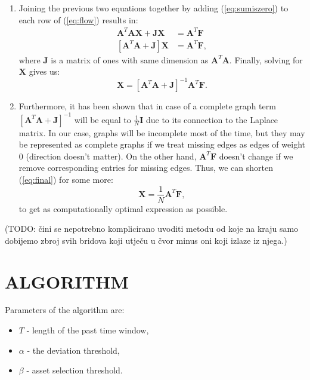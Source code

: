 \documentclass[letterpaper, 10 pt, conference]{ieeeconf}
\begin{document}
\begin{enumerate}
    \item Joining the previous two equations together by adding (\ref{eq:sumiszero}) to each row of (\ref{eq:flow}) results in:
    \begin{equation}
    \begin{aligned}
    \mathbf{A}^{T} \mathbf{A} \mathbf{X} + \mathbf{J} \mathbf{X} &= \mathbf{A}^{T} \mathbf{F}\\
    \left[\mathbf{A}^{T} \mathbf{A} + \mathbf{J} \right] \mathbf{X} &= \mathbf{A}^{T} \mathbf{F},
    \end{aligned}
    \end{equation}
    where $\mathbf{J}$ is a matrix of ones with same dimension as $\mathbf{A}^{T} \mathbf{A}$.
    Finally, solving for $\mathbf{X}$ gives us:
    \begin{equation}
    \label{eq:final}
    \mathbf{X} = \left[\mathbf{A}^T \mathbf{A} + \mathbf{J} \right]^{-1} \mathbf{A}^T \mathbf{F}.
    \end{equation}
    \item Furthermore, it has been shown that in case of a complete graph term $\left[ \mathbf{A}^T \mathbf{A} + \mathbf{J} \right]^{-1}$ will be equal to $\frac{1}{N} \mathbf{I}$ due to its connection to the Laplace matrix.
    In our case, graphs will be incomplete most of the time, but they may be represented as complete graphs if we treat missing edges as edges of weight 0 (direction doesn't matter).
    On the other hand, $\mathbf{A}^T \mathbf{F}$ doesn't change if we remove corresponding entries for missing edges.
    Thus, we can shorten (\ref{eq:final}) for some more:
    \begin{equation}
    \mathbf{X} = \frac{1}{N} \mathbf{A}^T \mathbf{F},
    \end{equation}
    to get as computationally optimal expression as possible.
  \end{enumerate}
  
  (TODO: \v{c}ini se nepotrebno komplicirano uvoditi metodu od koje na kraju samo dobijemo zbroj svih bridova koji utječu u čvor minus oni koji izlaze iz njega.)
  
  \section{ALGORITHM} 
  
  Parameters of the algorithm are:
  \begin{itemize}
    \item $T$ - length of the past time window,
    \item $\alpha$ - the deviation threshold,
    \item $\beta$ - asset selection threshold.
  \end{itemize}
  
\end{document}
